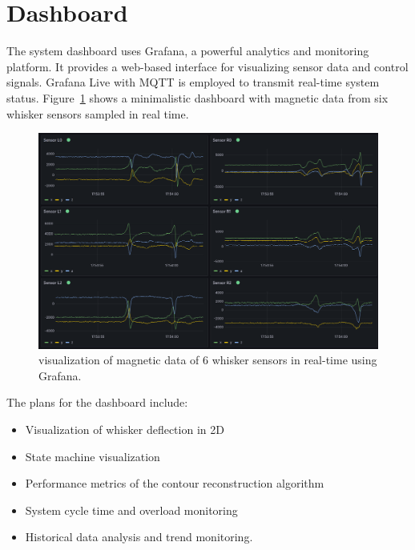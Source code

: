 \section{Dashboard}
The system dashboard uses Grafana, a powerful analytics and monitoring platform.
It provides a web-based interface for visualizing sensor data and control signals.
Grafana Live with MQTT is employed to transmit real-time system status.
Figure~\ref{fig:grafana} shows a minimalistic dashboard with magnetic data from six whisker sensors sampled in real time.


\begin{figure}[htb]
    \centering
    \includegraphics[width=\textwidth]{figures/grafana}
    \caption{visualization of magnetic data of 6 whisker sensors in real-time using Grafana.}
    \label{fig:grafana}
\end{figure}

The plans for the dashboard include:
\begin{itemize}
    \item Visualization of whisker deflection in 2D
    \item State machine visualization
    \item Performance metrics of the contour reconstruction algorithm
    \item System cycle time and overload monitoring
    \item Historical data analysis and trend monitoring.
\end{itemize}
